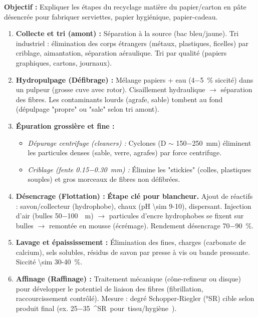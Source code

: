 \documentclass[11pt]{article}
\providecommand{\degree}{^{\circ}}
\newcommand{\cle}[1]{{\popxbold\color{popdark}#1}}
\begin{document}
\begin{methode}
\textbf{Objectif :} Expliquer les étapes du recyclage matière du papier/carton en pâte désencrée pour fabriquer serviettes, papier hygiénique, papier-cadeau.
\begin{enumerate}
    \item \textbf{Collecte et tri (amont) :} Séparation à la source (bac bleu/jaune). Tri industriel : élimination des corps étrangers (métaux, plastiques, ficelles) par criblage, aimantation, séparation aéraulique. Tri par qualité (papiers graphiques, cartons, journaux).
    \item \textbf{Hydropulpage (Défibrage) :} Mélange papiers + eau (\SI{4-5}{\%} siccité) dans un pulpeur (grosse cuve avec rotor). Cisaillement hydraulique $\rightarrow$ séparation des fibres. Les contaminants lourds (agrafe, sable) tombent au fond (dépulpage "propre" ou "sale" selon tri amont).
    \item \textbf{Épuration grossière et fine :} 
    \begin{itemize}
        \item \textit{Dépurage centrifuge (cleaners) :} Cyclones (D $\sim$ \SI{150-250}{mm}) éliminent les particules denses (sable, verre, agrafes) par force centrifuge.
        \item \textit{Criblage (fente \SI{0,15-0,30}{mm}) :} Élimine les "stickies" (colles, plastiques souples) et gros morceaux de fibres non défibrées.
    \end{itemize}
    \item \textbf{Désencrage (Flottation) :} \textbf{Étape clé pour blancheur.} Ajout de réactifs : savon/collecteur (hydrophobe), chaux (pH \num{\sim 9-10}), dispersant. Injection d'air (bulles \SI{50-100}{\mu m}) $\rightarrow$ particules d'encre hydrophobes se fixent sur bulles $\rightarrow$ remontée en mousse (écrémage). Rendement désencrage \SI{70-90}{\%}.
    \item \textbf{Lavage et épaississement :} Élimination des fines, charges (carbonate de calcium), sels solubles, résidus de savon par presse à vis ou bande pressante. Siccité \SI{\sim 30-40}{\%}.
    \item \textbf{Affinage (Raffinage) :} Traitement mécanique (cône-refineur ou disque) pour développer le potentiel de liaison des fibres (fibrillation, raccourcissement contrôlé). Mesure : degré \cle{Schopper-Riegler} (\cle{°SR}) cible selon produit final (ex. \SI{25-35}{\degree SR} pour tissu/hygiène).

\end{enumerate}
\end{methode}
\end{document}
